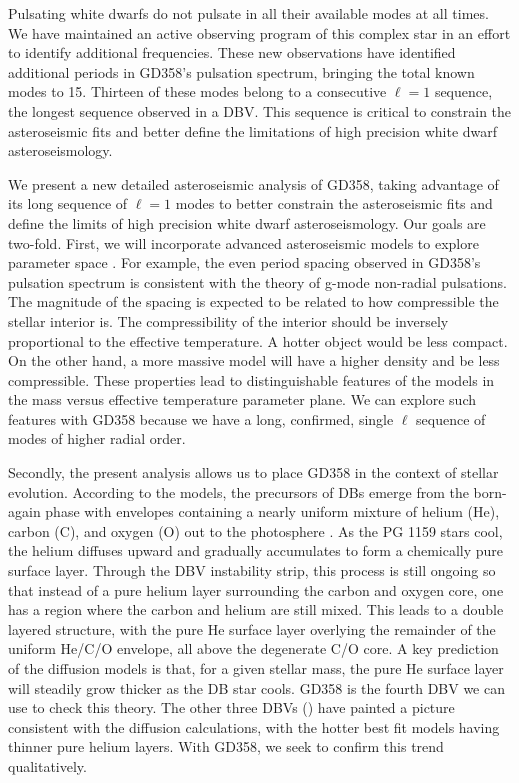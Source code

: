 \documentclass[12pt,preprint]{aastex}
\begin{document}
Pulsating white dwarfs do not pulsate in all their available modes at all times.  
We have maintained an active observing program of this complex star in an effort 
to identify additional frequencies. These new observations have identified additional 
periods in GD358's pulsation spectrum, bringing the total known modes to 15. Thirteen of 
these modes belong to a consecutive $\ell=1$ sequence, the longest sequence observed 
in a DBV. This sequence is critical to constrain the asteroseismic fits and better define the
limitations of high precision white dwarf asteroseismology. 

We present a new detailed asteroseismic analysis of GD358, taking advantage of 
its long sequence of $\ell=1$ modes to better constrain the asteroseismic fits and 
define the limits of high precision white dwarf asteroseismology.  Our goals are two-fold.  
First, we will incorporate advanced asteroseismic models to explore parameter space 
\citep{BischoffKim14}. For example, the even period spacing observed in GD358's 
pulsation spectrum is consistent with the theory of g-mode non-radial pulsations. The 
magnitude of the spacing is expected to be related to how compressible the stellar 
interior is. The compressibility of the interior should be inversely proportional to the 
effective temperature. A hotter object would be less compact. On the other hand, a more 
massive model will have a higher density and be less compressible. These properties lead 
to distinguishable features of the models in the mass versus effective temperature 
parameter plane. We can explore such features with GD358 because we have a long, 
confirmed, single $\ell$ sequence of modes of higher radial order.

Secondly, the present analysis allows us to place GD358 in the context of stellar evolution. 
According to the models, the precursors of DBs emerge from the born-again phase with 
envelopes containing a nearly uniform mixture of helium (He), carbon (C), and oxygen (O) 
out to the photosphere \citep{Dreizler98,Herwig99}. As the PG 1159 stars cool, the helium 
diffuses upward and gradually accumulates to form a chemically pure surface layer. Through 
the DBV instability strip, this process is still ongoing so that instead of a pure helium 
layer surrounding the carbon and oxygen core, one has a region where the carbon and helium 
are still mixed. This leads to a double layered structure, with the pure He surface layer 
overlying the remainder of the uniform He/C/O envelope, all above the degenerate C/O core. 
A key prediction of the diffusion models is that, for a given stellar mass, the pure He 
surface layer will steadily grow thicker as the DB star cools.  GD358 is the fourth DBV 
we can use to check this theory. The other three DBVs 
(\citet{Bischoff-Kim14,Sullivan08, Metcalfe03c}) have painted a picture consistent with 
the diffusion calculations, with the hotter best fit models having thinner pure helium 
layers. With GD358, we seek to confirm this trend qualitatively.
\end{document}

